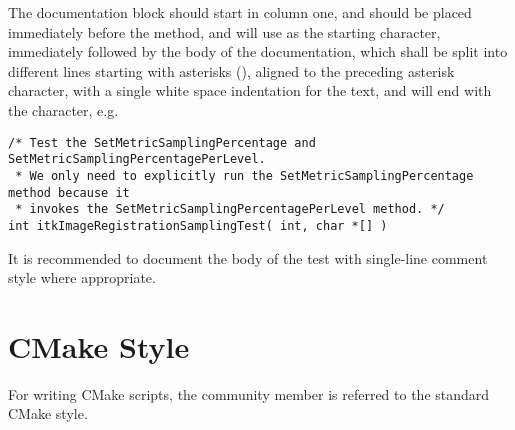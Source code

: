 The documentation block should start in column one, and should be placed
immediately before the  method, and will use \code{/*} as the
starting character, immediately followed by the body of the documentation, which
shall be split into different lines starting with asterisks (\code{*}), aligned
to the preceding asterisk character, with a single white space indentation for
the text, and will end with the \code{*/} character, e.g.

\small
\begin{verbatim}
/* Test the SetMetricSamplingPercentage and SetMetricSamplingPercentagePerLevel.
 * We only need to explicitly run the SetMetricSamplingPercentage method because it
 * invokes the SetMetricSamplingPercentagePerLevel method. */
int itkImageRegistrationSamplingTest( int, char *[] )
\end{verbatim}
\normalsize

It is recommended to document the body of the test with single-line comment
style where appropriate.


\section{CMake Style}
\label{sec:CMakeStyle}

For writing CMake scripts, the community member is referred to the standard
CMake style.
